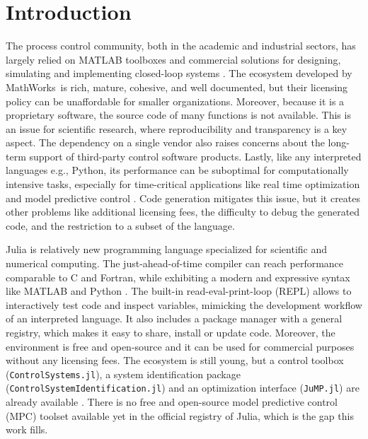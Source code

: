 \section{Introduction}

The process control community, both in the academic and industrial sectors, has largely relied on MATLAB toolboxes and commercial solutions for designing, simulating and implementing closed-loop systems \citep{optimMatlab}. The ecosystem developed by MathWorks\texttrademark\ is rich, mature, cohesive, and well documented, but their licensing policy can be unaffordable for smaller organizations. Moreover, because it is a proprietary software, the source code of many functions is not available. This is an issue for scientific research, where reproducibility and transparency is a key aspect. The dependency on a single vendor also raises concerns about the long-term support of third-party control software products. Lastly, like any interpreted languages e.g., Python, its performance can be suboptimal for computationally intensive tasks, especially for time-critical applications like real time optimization and model predictive control \citep{matlabPythonJulia, juliaML}. Code generation mitigates this issue, but it creates other problems like additional licensing fees, the difficulty to debug the generated code, and the restriction to a subset of the language.

Julia is relatively new programming language specialized for scientific and numerical computing. The just-ahead-of-time compiler can reach performance comparable to C and Fortran, while exhibiting a modern and expressive syntax like MATLAB and Python \citep{juliaPaper}. The built-in read-eval-print-loop (REPL) allows to interactively test code and inspect variables, mimicking the development workflow of an interpreted language. It also includes a package manager with a general registry, which makes it easy to share, install or update code. Moreover, the environment is free and open-source and it can be used for commercial purposes without any licensing fees. The ecosystem is still young, but a control toolbox (\texttt{ControlSystems.jl}), a system identification package (\texttt{ControlSystemIdentification.jl}) and an optimization interface (\texttt{JuMP.jl}) are already available \citep{controlsystems, jump}. There is no free and open-source model predictive control (MPC) toolset available yet in the official registry of Julia, which is the gap this work fills.

